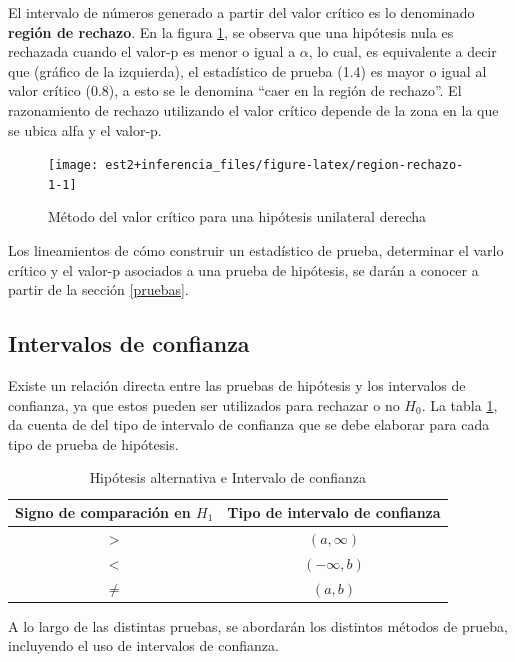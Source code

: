\documentclass[
  11pt,
]{book}
\theoremstyle{definition}
\theoremstyle{definition}
\theoremstyle{definition}
\theoremstyle{definition}
\theoremstyle{remark}
\begin{document}
El intervalo de números generado a partir del valor crítico es lo denominado \textbf{región de rechazo}. En la figura \ref{fig:region-rechazo-1}, se observa que una hipótesis nula es rechazada cuando el valor-p es menor o igual a \(\alpha\), lo cual, es equivalente a decir que (gráfico de la izquierda), el estadístico de prueba (1.4) es mayor o igual al valor crítico (0.8), a esto se le denomina ``caer en la región de rechazo''. El razonamiento de rechazo utilizando el valor crítico depende de la zona en la que se ubica alfa y el valor-p.

\begin{figure}

{\centering \texttt{[image: est2+inferencia\_files/figure-latex/region-rechazo-1-1]} 

}

\caption{Método del valor crítico para una hipótesis unilateral derecha}\label{fig:region-rechazo-1}
\end{figure}

Los lineamientos de cómo construir un estadístico de prueba, determinar el varlo crítico y el valor-p asociados a una prueba de hipótesis, se darán a conocer a partir de la sección \ref{pruebas}.

\subsection{Intervalos de confianza}\label{prueba-de-hipotesis-intervalos-de-confianza}

Existe un relación directa entre las pruebas de hipótesis y los intervalos de confianza, ya que estos pueden ser utilizados para rechazar o no \(H_0\). La tabla \ref{tab:ICpruebas}, da cuenta de del tipo de intervalo de confianza que se debe elaborar para cada tipo de prueba de hipótesis.

\begin{table}[H]
\centering
\caption{\label{tab:ICpruebas}Hipótesis alternativa e Intervalo de confianza}
\centering
\begin{tabular}[t]{cc}
\toprule
Signo de comparación en $H_1$ & Tipo de intervalo de confianza\\
\midrule
$>$ & $(a,\infty )$\\
$<$ & $(-\infty ,b)$\\
$\neq$ & $(a,b)$\\
\bottomrule
\end{tabular}
\end{table}

A lo largo de las distintas pruebas, se abordarán los distintos métodos de prueba, incluyendo el uso de intervalos de confianza.
\end{document}
